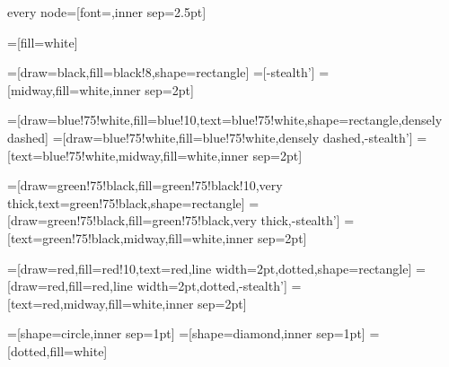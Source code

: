 \usepackage{tikz}
\usetikzlibrary{arrows,automata,positioning,er}

\tikzstyle every node=[font=\footnotesize\sffamily,inner sep=2.5pt]

\newcommand{\red}{red}
\newcommand{\redfill}{\red!10}
\newcommand{\green}{green!75!black}
\newcommand{\greenfill}{\green!10}
\newcommand{\blue}{blue!75!white}
\newcommand{\bluefill}{blue!10}
\newcommand{\grey}{black!8}
=[fill=white]

=[draw=black,fill=\grey,shape=rectangle]
=[-stealth']
=[midway,fill=white,inner sep=2pt]

=[draw=\blue,fill=\bluefill,text=\blue,shape=rectangle,densely dashed]
=[draw=\blue,fill=\blue,densely dashed,-stealth']
=[text=\blue,midway,fill=white,inner sep=2pt]

=[draw=\green,fill=\greenfill,very thick,text=\green,shape=rectangle]
=[draw=\green,fill=\green,very thick,-stealth']
=[text=\green,midway,fill=white,inner sep=2pt]

=[draw=\red,fill=\redfill,text=\red,line width=2pt,dotted,shape=rectangle]
=[draw=\red,fill=\red,line width=2pt,dotted,-stealth']
=[text=\red,midway,fill=white,inner sep=2pt]

=[shape=circle,inner sep=1pt]
=[shape=diamond,inner sep=1pt]
=[dotted,fill=white]

\newcommand{\ml}[1]{
\begin{tabular}{@{}l@{}}#1\vspace{-2pt}\end{tabular}
}
